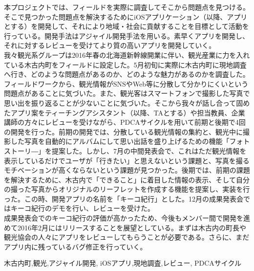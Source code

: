 \begin{jabstract}
\quad 本プロジェクトでは、フィールドを実際に調査してそこから問題点を見つける。そこで見つかった問題点を解決するためにiOSアプリケーション（以降、アプリとする）を開発して、それにより地域・社会に貢献することを目標として活動を行っている。開発手法はアジャイル開発手法を用いる。素早くアプリを開発し、それに対するレビューを受けてより質の高いアプリを開発していく。\\
\quad 我々観光系グループは2016年春の北海道新幹線開業に伴い、観光産業に力を入れている木古内町をフィールドに設定した。5月初旬に実際に木古内町に現地調査へ行き、どのような問題点があるのか、どのような魅力があるのかを調査した。フィールドワークから、観光情報がSNSやWeb等に分散して分かりにくいという問題点があることに気づいた。また、観光客はスマートフォンで撮影した写真で思い出を振り返ることが少ないことに気づいた。そこから我々が話し合って固めたアプリ案をティーチングアシスタント（以降、TAとする）や担当教員、企業講師の方々にレビューを受けながら、PDCAサイクルを用いて前期と後期で4回の開発を行った。前期の開発では、分散している観光情報の集約と、観光中に撮影した写真を自動的にアルバムにして思い出話を盛り上げるための機能「フォトストーリ―」を提案した。しかし、7月の中間発表会で、これはただ観光情報を表示しているだけでユーザが「行きたい」と思えないという課題と、写真を撮るモチベーションが高くならないという課題が見つかった。後期では、前期の課題を解決するために、木古内で「できること」に着目した情報の表示、そして自分の撮った写真からオリジナルのリーフレットを作成する機能を提案し、実装を行った。この時、開発アプリの名前を「キーコ紀行」とした。12月の成果発表会ではキーコ紀行のデモを行い、レビューを受けた。\\
\quad 成果発表会でのキーコ紀行の評価が高かったため、今後もメンバー間で開発を進めて2016年2月にはリリースすることを展望としている。まずは木古内の町長や観光協会の人々にアプリをレビューしてもらうことが必要である。さらに、まだアプリ内に残っているバグ修正を行っていく。\\

\begin{jkeyword}
木古内町,観光,アジャイル開発, iOSアプリ,現地調査,レビュー, PDCAサイクル
\end{jkeyword}
\end{jabstract}

